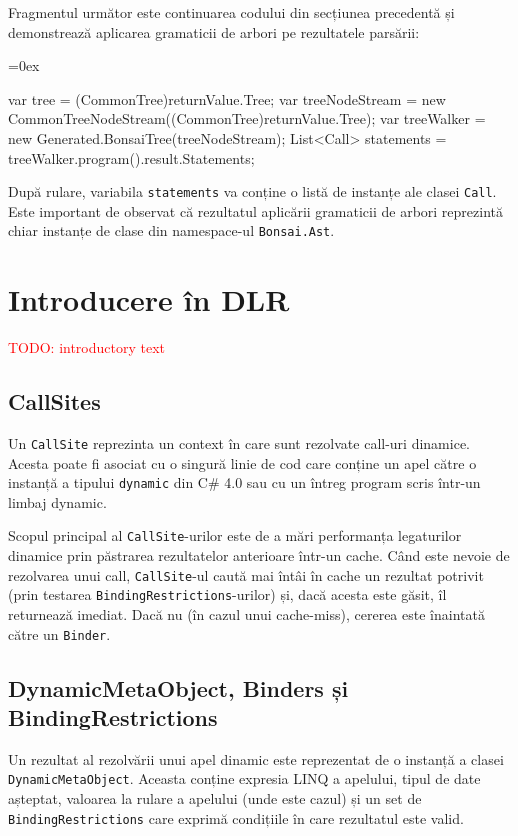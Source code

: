 \documentclass[12pt,a4paper]{memoir}
\newcommand{\draft}{\textcolor{red}}
\renewcommand{\c}{\texttt}
\newenvironment{code}
{
\definecolor{shadecolor}{gray}{0.91}
\topsep=0ex
\relax
\shaded
\verbatim
}
{
\endverbatim
\endshaded
}
\begin{document}
Fragmentul următor este continuarea codului din secțiunea precedentă și demonstrează aplicarea gramaticii de arbori pe rezultatele parsării:

\begin{code}
var tree = (CommonTree)returnValue.Tree;
var treeNodeStream = 
    new CommonTreeNodeStream((CommonTree)returnValue.Tree);
var treeWalker = new Generated.BonsaiTree(treeNodeStream);
List<Call> statements = treeWalker.program().result.Statements;
\end{code}

După rulare, variabila \c{statements} va conține o listă de instanțe ale clasei \c{Call}. Este important de observat că rezultatul aplicării gramaticii de arbori reprezintă chiar instanțe de clase din namespace-ul \c{Bonsai.Ast}.

\chapter{Introducere în DLR}

\draft{TODO: introductory text}

\section{CallSites}

Un \c{CallSite} reprezinta un context în care sunt rezolvate call-uri dinamice. Acesta poate fi asociat cu o singură linie de cod care conține un apel către o instanță a tipului \c{dynamic} din C\# 4.0\cite{csharp_4_specs} sau cu un întreg program scris într-un limbaj dynamic. 

Scopul principal al \c{CallSite}-urilor este de a mări performanța legaturilor dinamice prin păstrarea rezultatelor anterioare într-un cache. Când este nevoie de rezolvarea unui call, \c{CallSite}-ul caută mai întâi în cache un rezultat potrivit (prin testarea \c{BindingRestrictions}-urilor) și, dacă acesta este găsit, îl returnează imediat. Dacă nu (în cazul unui cache-miss), cererea este înaintată către un \c{Binder}.

\section{DynamicMetaObject, Binders și BindingRestrictions}

Un rezultat al rezolvării unui apel dinamic este reprezentat de o instanță a clasei \c{DynamicMetaObject}\cite{dynamic_meta_object}. Aceasta conține expresia LINQ\cite{linq_expressions} a apelului, tipul de date așteptat, valoarea la rulare a apelului (unde este cazul) și un set de \c{BindingRestrictions} care exprimă condițiile în care rezultatul este valid.
\end{document}

